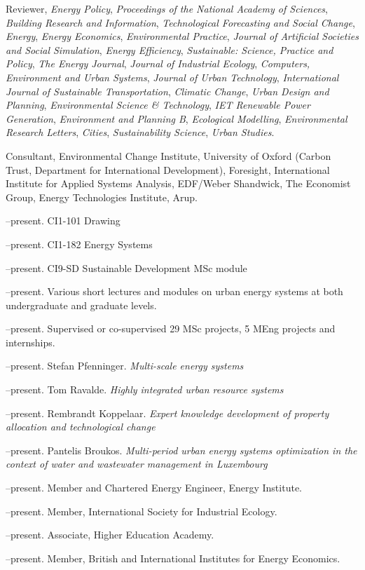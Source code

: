 \documentclass[11pt,a4paper]{article}
\begin{document}
\ind Reviewer, \emph{Energy Policy}, \emph{Proceedings of the National Academy of Sciences}, \emph{Building Research and Information}, \emph{Technological Forecasting and Social Change}, \emph{Energy}, \emph{Energy Economics}, \emph{Environmental Practice}, \emph{Journal of Artificial Societies and Social Simulation}, \emph{Energy Efficiency}, \emph{Sustainable: Science, Practice and Policy}, \emph{The Energy Journal}, \emph{Journal of Industrial Ecology}, \emph{Computers, Environment and Urban Systems}, \emph{Journal of Urban Technology}, \emph{International Journal of Sustainable Transportation}, \emph{Climatic Change}, \emph{Urban Design and Planning}, \emph{Environmental Science \& Technology}, \emph{IET Renewable Power Generation}, \emph{Environment and Planning B}, \emph{Ecological Modelling}, \emph{Environmental Research Letters}, \emph{Cities}, \emph{Sustainability Science}, \emph{Urban Studies}.

\ind Consultant, Environmental Change Institute, University of Oxford (Carbon Trust, Department for International Development), Foresight, International Institute for Applied Systems Analysis, EDF/Weber Shandwick, The Economist Group, Energy Technologies Institute, Arup.
\bigskip%

\newpage
\noindent{}%
%
--present.  CI{1-101} Drawing

--present.  CI{1-182} Energy Systems

--present.  CI{9-SD} Sustainable Development MSc module

--present. Various short lectures and modules on urban energy systems at both undergraduate and graduate levels.
 
--present. Supervised or co-supervised 29 MSc projects, 5 MEng projects and internships.

\bigskip
\noindent{}%
--present.  Stefan Pfenninger. \emph{Multi-scale energy systems}

--present.  Tom Ravalde. \emph{Highly integrated urban resource systems}

--present.  Rembrandt Koppelaar. \emph{Expert knowledge development of property allocation and technological change} 

--present.  Pantelis Broukos. \emph{Multi-period urban energy systems optimization in the context of water and wastewater management in Luxembourg}
\bigskip

\noindent{}%
%
--present.  Member and Chartered Energy Engineer, Energy Institute.

--present.  Member, International Society for Industrial Ecology.

--present.  Associate, Higher Education Academy.

--present.  Member, British and International Institutes for Energy Economics.
\end{document}
